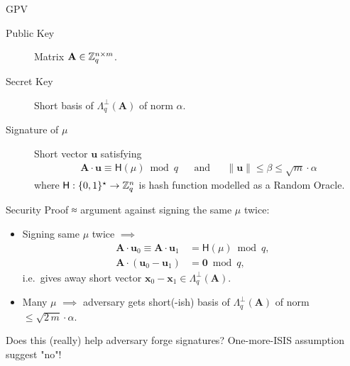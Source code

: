 \documentclass[xcolor=table,10pt,aspectratio=169]{beamer}
\renewcommand{\vec}[1]{\ensuremath{\mathbf{#1}}\xspace}
\newcommand{\norm}[1]{\left\lVert#1\right\rVert}
\providecommand{\mat}[1]{\ensuremath{\vec{#1}}\xspace}
\begin{document}
\begin{frame}[label={sec:orgda0b10f}]{GPV}
\begin{description}
\item[{Public Key}] Matrix \(\mat{A} \in \ZZ_q^{n \times m}\).
\item[{Secret Key}] Short basis of \(\Lambda_q^\bot(\mat{A})\) of norm \(\alpha\).
\item[{Signature of \(\mu\)}] Short vector \(\vec{u}\) satisfying
\[\begin{aligned}
  \mat{A} \cdot \vec{u} \equiv \mathsf{H}(\mu) \bmod q && \text{and} && \norm{\vec{u}} \leq \beta \leq \sqrt{m} \cdot \alpha
  \end{aligned}\]
where \(\mathsf{H}: \{0,1\}^{\star} \to \mathbb{Z}_q^n\) is hash function modelled as a Random Oracle.
\end{description}
\end{frame}

\begin{frame}[label={sec:org462cf43}]{Security Proof ≈ argument against signing the same \(\mu\) twice:}
\begin{itemize}
\item Signing same \(\mu\) twice \(\implies\)
\[\begin{aligned}
  \mat{A} \cdot \vec{u}_0 \equiv \mat{A} \cdot \vec{u}_1 &= \mathsf{H}(\mu) \bmod q, \\
  \mat{A} \cdot (\vec{u}_0 - \vec{u}_1) &= \vec{0} \bmod q,
  \end{aligned}\]
i.e. gives away short vector \(\vec{x}_0 - \vec{x}_1 \in \Lambda_q^\bot(\mat{A})\).
\item Many \(\mu\) \(\implies\) adversary gets short(-ish) basis of \(\Lambda_q^\bot(\mat{A})\) of norm \(\leq \sqrt{2\,m} \cdot \alpha\).
\end{itemize}

\begin{alertblock}{Does this (really) help adversary forge signatures?}
One-more-ISIS assumption suggest "no"!
\end{alertblock}
\end{frame}
\end{document}
